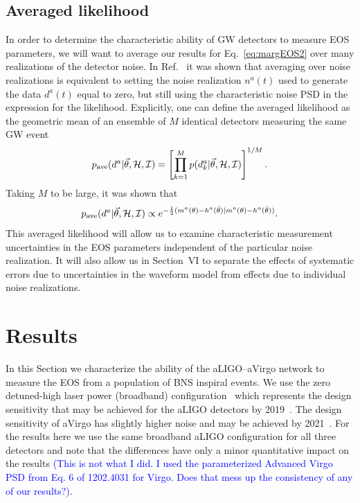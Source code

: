 \documentclass[twocolumn,prd,amssymb,aps,nofootinbib,showpacs,epsf]{revtex4}
\newcommand\les[2]{\textcolor{blue}{{#1}\sout{#2}}}
\begin{document}
\subsection{Averaged likelihood}

In order to determine the characteristic ability of GW detectors to measure EOS parameters, we will want to average our results for Eq.~\eqref{eq:margEOS2} over many realizations of the detector noise. In Ref.~\cite{NissankeHolzHughes2010} it was shown that averaging over noise realizations is equivalent to setting the noise realization $n^a(t)$ used to generate the data $d^a(t)$ equal to zero, but still using the characteristic noise PSD in the expression for the likelihood. Explicitly, one can define the averaged likelihood as the geometric mean of an ensemble of $M$ identical detectors measuring the same GW event
\begin{equation}
p_{\rm ave}(d^a | \vec\theta, \mathcal{H}, \mathcal{I}) = \left[\prod_{k=1}^M p(d_k^a | \vec\theta, \mathcal{H}, \mathcal{I})\right]^{1/M}.
\end{equation}
Taking $M$ to be large, it was shown that
\begin{equation}
\label{eq:averagedlike}
p_{\rm ave}(d^a | \vec\theta, \mathcal{H}, \mathcal{I}) \propto e^{-\frac{1}{2}(m^a(\theta) - h^a(\hat\theta) | m^a(\theta) - h^a(\hat\theta))}.
\end{equation}
This averaged likelihood will allow us to examine characteristic measurement uncertainties in the EOS parameters independent of the particular noise realization. It will also allow us in Section~VI to separate the effects of systematic errors due to uncertainties in the waveform model from effects due to individual noise realizations.


\section{Results}
\label{sec:results}

In this Section we characterize the ability of the aLIGO--aVirgo network to measure the EOS from a population of BNS inspiral events. We use the zero detuned-high laser power (broadband) configuration~\cite{LIGOnoise} which represents the design sensitivity that may be achieved for the aLIGO detectors by 2019~\cite{AasiAbadieAbbott2013}. The design sensitivity of aVirgo has slightly higher noise and may be achieved by 2021~\cite{AasiAbadieAbbott2013}. For the results here we use the same broadband aLIGO configuration for all three detectors and note that the differences have only a minor quantitative impact on the results \les{(This is not what I did.  I used the parameterized Advanced Virgo PSD from Eq. 6 of 1202.4031 for Virgo.  Does that mess up the consistency of any of our results?)}{}.
\end{document}
